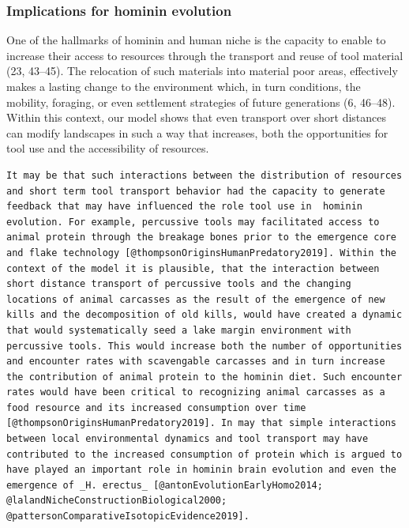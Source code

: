 \documentclass[9pt,twocolumn,twoside,]{pnas-new}
\begin{document}
\hypertarget{implications-for-hominin-evolution}{%
\subsubsection{Implications for hominin
evolution}\label{implications-for-hominin-evolution}}

\hspace{0pt} One of the hallmarks of hominin and human niche is the
capacity to enable to increase their access to resources through the
transport and reuse of tool material (23, 43--45). The relocation of
such materials into material poor areas, effectively makes a lasting
change to the environment which, in turn conditions, the mobility,
foraging, or even settlement strategies of future generations (6,
46--48). Within this context, our model shows that even transport over
short distances can modify landscapes in such a way that increases, both
the opportunities for tool use and the accessibility of resources.

\begin{verbatim}
It may be that such interactions between the distribution of resources and short term tool transport behavior had the capacity to generate feedback that may have influenced the role tool use in  hominin evolution. For example, percussive tools may facilitated access to animal protein through the breakage bones prior to the emergence core and flake technology [@thompsonOriginsHumanPredatory2019]. Within the context of the model it is plausible, that the interaction between short distance transport of percussive tools and the changing locations of animal carcasses as the result of the emergence of new kills and the decomposition of old kills, would have created a dynamic that would systematically seed a lake margin environment with percussive tools. This would increase both the number of opportunities and encounter rates with scavengable carcasses and in turn increase the contribution of animal protein to the hominin diet. Such encounter rates would have been critical to recognizing animal carcasses as a food resource and its increased consumption over time [@thompsonOriginsHumanPredatory2019]. In may that simple interactions between local environmental dynamics and tool transport may have contributed to the increased consumption of protein which is argued to have played an important role in hominin brain evolution and even the emergence of _H. erectus_ [@antonEvolutionEarlyHomo2014; @lalandNicheConstructionBiological2000; @pattersonComparativeIsotopicEvidence2019].
\end{verbatim}
\end{document}
